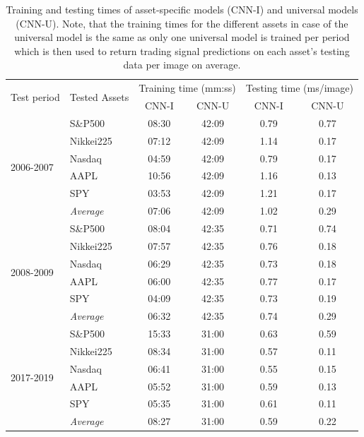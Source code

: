 \documentclass[12pt, a4paper]{article}
\begin{document}
\begin{table}[H]
\centering
\begin{tabular}{l|l|cc|cc}
\multicolumn{1}{m{1cm}|}{\multirow{2}{1cm}{Test period}} & \multicolumn{1}{m{1.5cm}|}{\multirow{2}{1.5cm}{Tested Assets}} & \multicolumn{2}{c|}{Training time (mm:ss) } & \multicolumn{2}{c}{Testing time (ms/image)} \\ \cline{3-6}
&& CNN-I & CNN-U & CNN-I & CNN-U \\ 
\hline \hline
\multirow{6}{1cm}{2006-2007} & S\&P500   & 08:30 & 42:09 & 0.79 & 0.77 \\
          & Nikkei225 & 07:12 & 42:09 & 1.14 & 0.17 \\
          & Nasdaq    & 04:59 & 42:09 & 0.79 & 0.17 \\
          & AAPL      & 10:56 & 42:09 & 1.16 & 0.13 \\
          & SPY       & 03:53 & 42:09 & 1.21 & 0.17 \\ \cline{2-6}
          & \textit{Average}   & 07:06 & 42:09 & 1.02 & 0.29 \\ \hline
\multirow{6}{1cm}{2008-2009} & S\&P500          & 08:04 & 42:35 & 0.71 & 0.74 \\
 & Nikkei225        & 07:57 & 42:35 & 0.76 & 0.18 \\
 & Nasdaq           & 06:29 & 42:35 & 0.73 & 0.18 \\
 & AAPL             & 06:00 & 42:35 & 0.77 & 0.17 \\
 & SPY              & 04:09 & 42:35 & 0.73 & 0.19 \\ \cline{2-6} 
 & \textit{Average} & 06:32 & 42:35 & 0.74 & 0.29 \\\hline
\multirow{6}{1cm}{2017-2019} & S\&P500   & 15:33 & 31:00 & 0.63 & 0.59 \\
          & Nikkei225 & 08:34 & 31:00 & 0.57 & 0.11 \\
          & Nasdaq    & 06:41 & 31:00 & 0.55 & 0.15 \\
          & AAPL      & 05:52 & 31:00 & 0.59 & 0.13 \\
          & SPY       & 05:35 & 31:00 & 0.61 & 0.11 \\ \cline{2-6}
          & \textit{Average}   & 08:27 & 31:00 & 0.59 & 0.22
\end{tabular}
\caption{Training and testing times of asset-specific models (CNN-I) and universal models (CNN-U). Note, that the training times for the different assets in case of the universal model is the same as only one universal model is trained per period which is then used to return trading signal predictions on each asset's testing data per image on average.}
\label{tbl:TimeRes}
\end{table}
\end{document}
